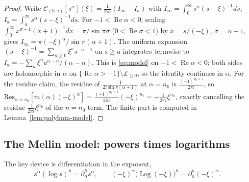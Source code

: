 \documentclass[pdflatex,sn-mathphys-num]{sn-jnl}%
\newcommand{\Z}{\mathbb{Z}}
\newcommand{\Cau}{\mathcal{C}}
\newcommand{\Real}{\operatorname{Re}}
\newcommand{\Log}{\operatorname{Log}}
\theoremstyle{thmstyleone}
\theoremstyle{thmstyletwo}
\theoremstyle{thmstylethree}
\begin{document}
\begin{proof}
Write $\Cau_{(0,a)}[s^{\alpha}](\xi)=\frac{1}{2\pi i}(I_\infty-I_a)$ with
$I_\infty=\int_0^\infty s^{\alpha}(s-\xi)^{-1}ds$,
$I_a=\int_a^\infty s^{\alpha}(s-\xi)^{-1}ds$. For $-1<\Real\alpha<0$, scaling
$\int_0^\infty x^{\sigma-1}(x+1)^{-1}dx=\pi/\sin\pi\sigma$ ($0<\Real\sigma<1$)
by $x=s/(-\xi)$, $\sigma=\alpha+1$, gives
$I_\infty=\pi(-\xi)^{\alpha}/\sin\pi(\alpha+1)$. The uniform expansion
$(s-\xi)^{-1}=\sum_{n\ge0}\xi^{n}s^{-n-1}$ on $s\ge a$ integrates termwise to
$I_a=-\sum_{n}\xi^{n}a^{\alpha-n}/(\alpha-n)$. This is \eqref{eq:model} on
$-1<\Real\alpha<0$; both sides are holomorphic in $\alpha$ on
$\{\Real\alpha>-1\}\setminus\Z_{\ge0}$, so the identity continues in $\alpha$.
For the residue claim, the residue of $\frac{1}{2i\sin\pi(\alpha+1)}$ at
$\alpha=n_0$ is $\frac{(-1)^{n_0+1}}{2\pi i}$, so
$\mathrm{Res}_{\alpha=n_0}[m(\alpha)(-\xi)^{\alpha}]
=\frac{(-1)^{n_0+1}}{2\pi i}(-\xi)^{n_0}=-\tfrac{1}{2\pi i}\xi^{n_0}$, exactly
cancelling the residue $\tfrac{1}{2\pi i}\xi^{n_0}$ of the $n=n_0$ term. The
finite part is computed in Lemma~\ref{lem:polyhom-model}.
\end{proof}

\subsection{The Mellin model: powers times logarithms}
The key device is differentiation in the exponent,
\begin{equation}\label{eq:dalpha}
  s^{\alpha}(\log s)^{h}=\partial_\alpha^{h}s^{\alpha},
  \qquad
  (-\xi)^{\alpha}\bigl(\Log(-\xi)\bigr)^{h}=\partial_\alpha^{h}(-\xi)^{\alpha}.
\end{equation}
\end{document}
